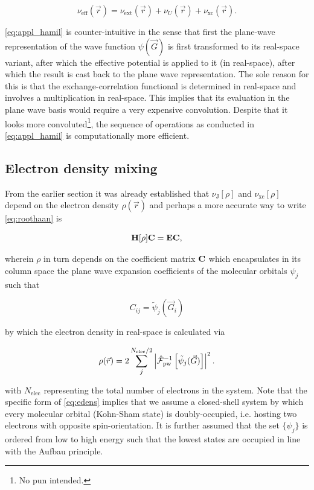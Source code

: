 \begin{equation}
    \nu_{\text{eff}}(\vec{r}) = \nu_{\text{ext}}(\vec{r}) + \nu_{U}(\vec{r}) + \nu_{\text{xc}}(\vec{r}).
\end{equation}

\cref{eq:appl_hamil} is counter-intuitive in the sense that first the plane-wave representation of the wave function $\psi(\vec{G})$ is first transformed to its real-space variant, after which the effective potential is applied to it (in real-space), after which the result is cast back to the plane wave representation. The sole reason for this is that the exchange-correlation functional is determined in real-space and involves a multiplication in real-space. This implies that its evaluation in the plane wave basis would require a very expensive convolution. Despite that it looks more convoluted\footnote{No pun intended.}, the sequence of operations as conducted in \cref{eq:appl_hamil} is computationally more efficient.

%
%
%
\subsection{Electron density mixing}

From the earlier section it was already established that $\nu_{\text{J}}[\rho]$ and $\nu_{\text{xc}}[\rho]$ depend on the electron density $\rho(\vec{r})$ and perhaps a more accurate way to write \cref{eq:roothaan} is

\begin{equation}
    \mathbf{H}[\rho]\mathbf{C} = \mathbf{E}\mathbf{C},
    \label{eq:roothaan_explicit}
\end{equation}

wherein $\rho$ in turn depends on the coefficient matrix $\mathbf{C}$ which encapsulates in its column space the plane wave expansion coefficients of the molecular orbitals $\psi_{j}$ such that

\begin{equation}
    C_{ij} = \tilde{\psi}_{j}(\vec{G}_{i})
\end{equation}

by which the electron density in real-space is calculated via

\begin{equation}
    \rho(\vec{r}) = 2\sum_{j}^{N_{\text{elec}} / 2} \left|\hat{\mathcal{F}}_{\text{pw}}^{-1} \left[ \tilde{\psi}_{j}(\vec{G}) \right] \right|^{2}.
    \label{eq:edens}
\end{equation}

with $N_{\text{elec}}$ representing the total number of electrons in the system. Note that the specific form of \cref{eq:edens} implies that we assume a closed-shell system by which every molecular orbital (Kohn-Sham state) is doubly-occupied, i.e. hosting two electrons with opposite spin-orientation. It is further assumed that the set $\{ \psi_{j} \}$ is ordered from low to high energy such that the lowest states are occupied in line with the Aufbau principle.

